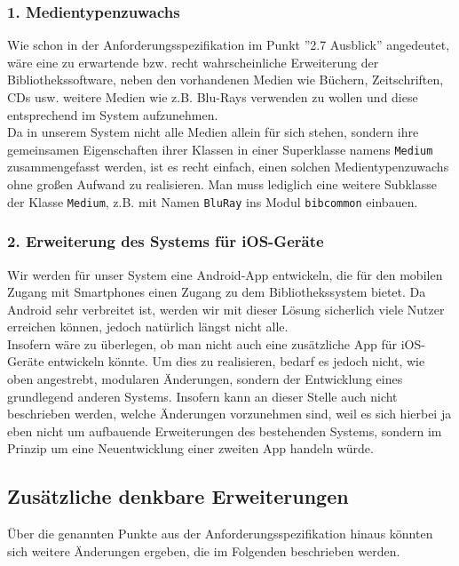 \documentclass[fontsize=12pt,paper=a4,twoside]{scrartcl}
\begin{document}
\subsubsection*{1. Medientypenzuwachs}

Wie schon in der Anforderungsspezifikation im Punkt ''2.7 Ausblick'' angedeutet, wäre eine zu erwartende bzw. recht wahrscheinliche Erweiterung der Bibliothekssoftware, neben den vorhandenen Medien wie Büchern, Zeitschriften, CDs usw. weitere Medien wie z.B. Blu-Rays verwenden zu wollen und diese entsprechend im System aufzunehmen.\\
Da in unserem System nicht alle Medien allein für sich stehen, sondern ihre gemeinsamen Eigenschaften ihrer Klassen in einer Superklasse namens \texttt{Medium} zusammengefasst werden, ist es recht einfach, einen solchen Medientypenzuwachs ohne großen Aufwand zu realisieren. Man muss lediglich eine weitere Subklasse der Klasse \texttt{Medium}, z.B. mit Namen \texttt{BluRay} ins Modul \texttt{bibcommon} einbauen.

\subsubsection*{2. Erweiterung des Systems für iOS-Geräte}

Wir werden für unser System eine Android-App entwickeln, die für den mobilen Zugang mit Smartphones einen Zugang zu dem Bibliothekssystem bietet. Da Android sehr verbreitet ist, werden wir mit dieser Lösung sicherlich viele Nutzer erreichen können, jedoch natürlich längst nicht alle. \\
Insofern wäre zu überlegen, ob man nicht auch eine zusätzliche App für iOS-Geräte entwickeln könnte. Um dies zu realisieren, bedarf es jedoch nicht, wie oben angestrebt, modularen Änderungen, sondern der Entwicklung eines grundlegend anderen Systems. Insofern kann an dieser Stelle auch nicht beschrieben werden, welche Änderungen vorzunehmen sind, weil es sich hierbei ja eben nicht um aufbauende Erweiterungen des bestehenden Systems, sondern im Prinzip um eine Neuentwicklung einer zweiten App handeln  würde.

\subsection*{Zusätzliche denkbare Erweiterungen}

Über die genannten Punkte aus der Anforderungsspezifikation hinaus könnten sich weitere Änderungen ergeben, die im Folgenden beschrieben werden.
\end{document}
